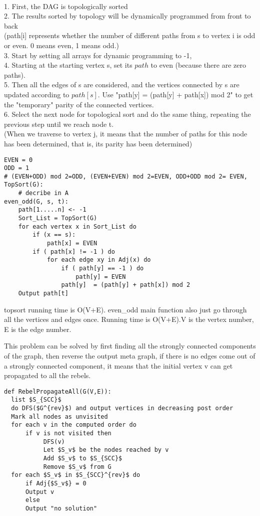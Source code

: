 \documentclass[12pt,a4paper]{article}
\newcommand{\question}[1]{\bigskip\noindent{\textbf{Q{#1} solution}}}
\begin{document}
\question{23.D}\\
1. First, the DAG is topologically sorted
\\2. The results sorted by topology will be dynamically programmed from front to back
\\(path[i] represents whether the number of different paths from s to vertex i is odd or even. 0 means even, 1 means odd.)
\\3. Start by setting all arrays for dynamic programming to -1,
\\4. Starting at the starting vertex s, set its $path$ to even (because there are zero paths).
\\5. Then all the edges of s are considered, and the vertices connected by s are updated according to $path[s]$. Use "path[y] = (path[y] + path[x]) mod 2" to get the "temporary" parity of the connected vertices.
\\6. Select the next node for topological sort and do the same thing, repeating the previous step until we reach node t.
\\(When we traverse to vertex j, it means that the number of paths for this node has been determined, that is, its parity has been determined)
\begin{lstlisting}
EVEN = 0 
ODD = 1
# (EVEN+ODD) mod 2=ODD, (EVEN+EVEN) mod 2=EVEN, ODD+ODD mod 2= EVEN, 
TopSort(G):
	# decribe in A
even_odd(G, s, t):
	path[1.....n] <- -1
	Sort_List = TopSort(G)
	for each vertex x in Sort_List do
		if (x == s):
			path[x] = EVEN
		if ( path[x] != -1 ) do
			for each edge xy in Adj(x) do
				if ( path[y] == -1 ) do
					path[y] = EVEN
				path[y]  = (path[y] + path[x]) mod 2
	Output path[t]
\end{lstlisting}
topsort running time is O(V+E). even\_odd main function also just go through all the vertices and edges once. Running time is O(V+E).V is the vertex number, E is the edge number.\\
\question{24.A}

This problem can be solved by first finding all the strongly connected components of the graph, then reverse the output meta graph, if there is no edges come out of a strongly connected component, it means that 
the initial vertex v can get propagated to all the rebels.

\begin{lstlisting}
def RebelPropagateAll(G(V,E)):
  list $S_{SCC}$
  do DFS($G^{rev}$) and output vertices in decreasing post order
  Mark all nodes as unvisited
  for each v in the computed order do
      if v is not visited then 
           DFS(v)
           Let $S_v$ be the nodes reached by v
           Add $S_v$ to $S_{SCC}$
           Remove $S_v$ from G
  for each $S_v$ in $S_{SCC}^{rev}$ do
      if Adj{$S_v$} = 0
      Output v
      else
      Output "no solution"
\end{lstlisting}
\end{document}
